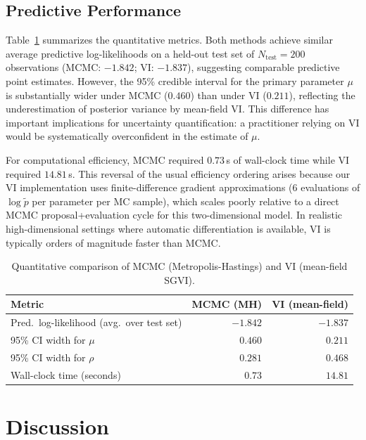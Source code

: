 \documentclass[12pt,a4paper]{article}
\newcommand{\pt}{\tilde{p}}
\begin{document}
\subsection{Predictive Performance}

Table~\ref{tab:results} summarizes the quantitative metrics.
Both methods achieve similar average predictive log-likelihoods on a
held-out test set of $N_{\text{test}} = 200$ observations
(MCMC: $-1.842$; VI: $-1.837$), suggesting comparable predictive
point estimates.
However, the 95\% credible interval for the primary parameter $\mu$
is substantially wider under MCMC ($0.460$) than under VI ($0.211$),
reflecting the underestimation of posterior variance by mean-field VI.
This difference has important implications for uncertainty quantification:
a practitioner relying on VI would be systematically overconfident
in the estimate of $\mu$.

For computational efficiency, MCMC required $0.73$\,s of wall-clock time
while VI required $14.81$\,s.
This reversal of the usual efficiency ordering arises because our VI
implementation uses finite-difference gradient approximations
(6 evaluations of $\log\pt$ per parameter per MC sample), which scales
poorly relative to a direct MCMC proposal+evaluation cycle for this
two-dimensional model.
In realistic high-dimensional settings where automatic differentiation
is available, VI is typically orders of magnitude faster than MCMC.

\begin{table}[h]
  \centering
  \caption{Quantitative comparison of MCMC (Metropolis-Hastings) and VI (mean-field SGVI).}
  \label{tab:results}
  \begin{tabular}{lrr}
    \toprule
    Metric & MCMC (MH) & VI (mean-field) \\
    \midrule
    Pred.\ log-likelihood (avg.\ over test set)  & $-1.842$  & $-1.837$  \\
    95\% CI width for $\mu$                      & $0.460$   & $0.211$   \\
    95\% CI width for $\rho$                     & $0.281$   & $0.468$   \\
    Wall-clock time (seconds)                    & $0.73$    & $14.81$   \\
    \bottomrule
  \end{tabular}
\end{table}

\section{Discussion}
\label{sec:discussion}
\end{document}
